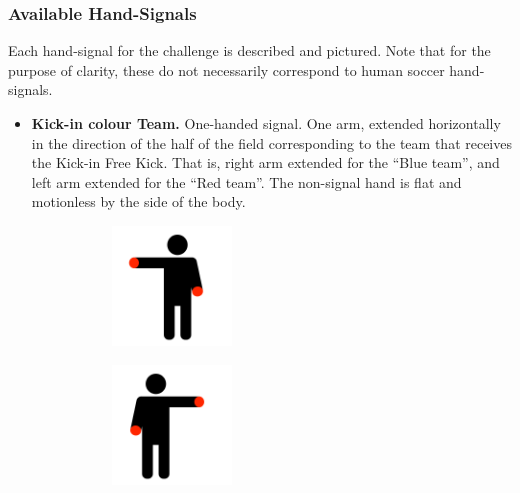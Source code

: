     \subsubsection{Available Hand-Signals}

        Each hand-signal for the challenge is described and pictured. Note that for the purpose of clarity, these do not necessarily correspond to human soccer hand-signals.

        \begin{itemize}
            \item \textbf{Kick-in \textlangle{}colour\textrangle{} Team.}
            One-handed signal. One arm, extended horizontally in the direction of the half of the field corresponding to the team that receives the Kick-in Free Kick. That is, right arm extended for the ``Blue team'', and left arm extended for the ``Red team''. The non-signal hand is flat and motionless by the side of the body.
            \begin{figure}[ht!]
                \centering
                \begin{subfigure}{.33\textwidth}
                  \includegraphics[height=120px]{figs/referee-signals/kick-in.png}
                \end{subfigure}
                \begin{subfigure}{.33\textwidth}
                  \includegraphics[height=120px]{figs/referee-signals/kick-in-flipped.png}
                \end{subfigure}
            \end{figure}
            

\end{itemize}
